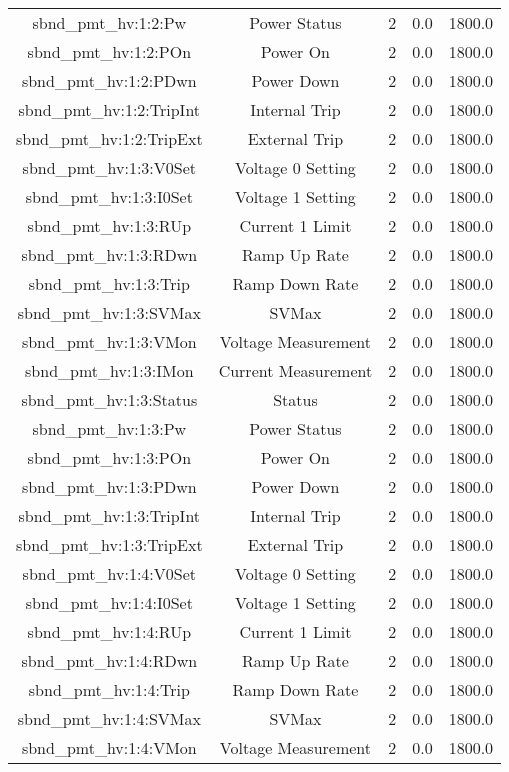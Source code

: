 \begin{center}
\begin{longtable}{c | c c c c }
sbnd\_pmt\_hv:1:2:Pw & Power Status & 2 & 0.0 & 1800.0\\ 
sbnd\_pmt\_hv:1:2:POn & Power On & 2 & 0.0 & 1800.0\\ 
sbnd\_pmt\_hv:1:2:PDwn & Power Down & 2 & 0.0 & 1800.0\\ 
sbnd\_pmt\_hv:1:2:TripInt & Internal Trip & 2 & 0.0 & 1800.0\\ 
sbnd\_pmt\_hv:1:2:TripExt & External Trip & 2 & 0.0 & 1800.0\\ 
sbnd\_pmt\_hv:1:3:V0Set & Voltage 0 Setting & 2 & 0.0 & 1800.0\\ 
sbnd\_pmt\_hv:1:3:I0Set & Voltage 1 Setting & 2 & 0.0 & 1800.0\\ 
sbnd\_pmt\_hv:1:3:RUp & Current 1 Limit & 2 & 0.0 & 1800.0\\ 
sbnd\_pmt\_hv:1:3:RDwn & Ramp Up Rate & 2 & 0.0 & 1800.0\\ 
sbnd\_pmt\_hv:1:3:Trip & Ramp Down Rate & 2 & 0.0 & 1800.0\\ 
sbnd\_pmt\_hv:1:3:SVMax & SVMax & 2 & 0.0 & 1800.0\\ 
sbnd\_pmt\_hv:1:3:VMon & Voltage Measurement & 2 & 0.0 & 1800.0\\ 
sbnd\_pmt\_hv:1:3:IMon & Current Measurement & 2 & 0.0 & 1800.0\\ 
sbnd\_pmt\_hv:1:3:Status & Status & 2 & 0.0 & 1800.0\\ 
sbnd\_pmt\_hv:1:3:Pw & Power Status & 2 & 0.0 & 1800.0\\ 
sbnd\_pmt\_hv:1:3:POn & Power On & 2 & 0.0 & 1800.0\\ 
sbnd\_pmt\_hv:1:3:PDwn & Power Down & 2 & 0.0 & 1800.0\\ 
sbnd\_pmt\_hv:1:3:TripInt & Internal Trip & 2 & 0.0 & 1800.0\\ 
sbnd\_pmt\_hv:1:3:TripExt & External Trip & 2 & 0.0 & 1800.0\\ 
sbnd\_pmt\_hv:1:4:V0Set & Voltage 0 Setting & 2 & 0.0 & 1800.0\\ 
sbnd\_pmt\_hv:1:4:I0Set & Voltage 1 Setting & 2 & 0.0 & 1800.0\\ 
sbnd\_pmt\_hv:1:4:RUp & Current 1 Limit & 2 & 0.0 & 1800.0\\ 
sbnd\_pmt\_hv:1:4:RDwn & Ramp Up Rate & 2 & 0.0 & 1800.0\\ 
sbnd\_pmt\_hv:1:4:Trip & Ramp Down Rate & 2 & 0.0 & 1800.0\\ 
sbnd\_pmt\_hv:1:4:SVMax & SVMax & 2 & 0.0 & 1800.0\\ 
sbnd\_pmt\_hv:1:4:VMon & Voltage Measurement & 2 & 0.0 & 1800.0\\ 

\end{longtable}
\end{center}
